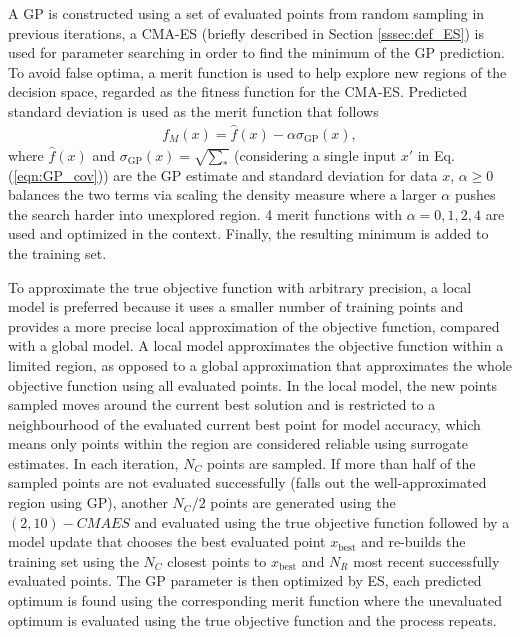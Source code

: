 A GP is constructed using a set of evaluated points from random sampling in previous iterations, a CMA-ES (briefly described in Section \ref{sssec:def_ES}) is used for parameter searching in order to find the minimum of the GP prediction. To avoid false optima, a merit function is used to help explore new regions of the decision space, regarded as the fitness function for the CMA-ES.   
Predicted standard deviation  is used as the merit function that follows 
\begin{align}
f_M (x) = \hat f(x) - \alpha \sigma_{\text{GP}} (x),
\end{align}
where $\hat f(x)$ and $\sigma_{\text{GP}} (x)=\sqrt{\sum_*}$ (considering a single input $x \prime$ in Eq. (\ref{eqn:GP_cov})) are the GP estimate and standard deviation for data $x$, $\alpha \geq 0$ balances the two terms via scaling the density measure where a larger $\alpha$ pushes the search harder into unexplored region. 4 merit functions with $\alpha =0,1,2,4$ are used and optimized in the context. Finally, the resulting minimum is added to the training set.

To approximate the true objective function with arbitrary precision, a local model is preferred because it uses a smaller number of training points and provides a more precise local approximation of the objective function, compared with a global model. A local model approximates the objective function within a limited region, as opposed to a global approximation that approximates the whole objective function using all evaluated points. In the local model, the new points sampled moves around the current best solution and is restricted to a neighbourhood of the evaluated current best point for model accuracy, which means only points within the region are considered reliable using surrogate estimates. In each iteration, $N_C$ points are sampled. If more than half of the sampled points are not evaluated successfully (falls out the well-approximated region using GP), another $N_C/2$ points are generated using the $(2,10)-CMAES$ and evaluated using the true objective function followed by a model update that chooses the best evaluated point $x_{\text{best}}$ and re-builds the training set using the $N_C$ closest points to $x_{\text{best}}$ and $N_R$ most recent successfully evaluated points. The GP parameter is then optimized by ES, each predicted optimum is found using the corresponding merit function where the unevaluated optimum is evaluated using the true objective function and the process repeats.


